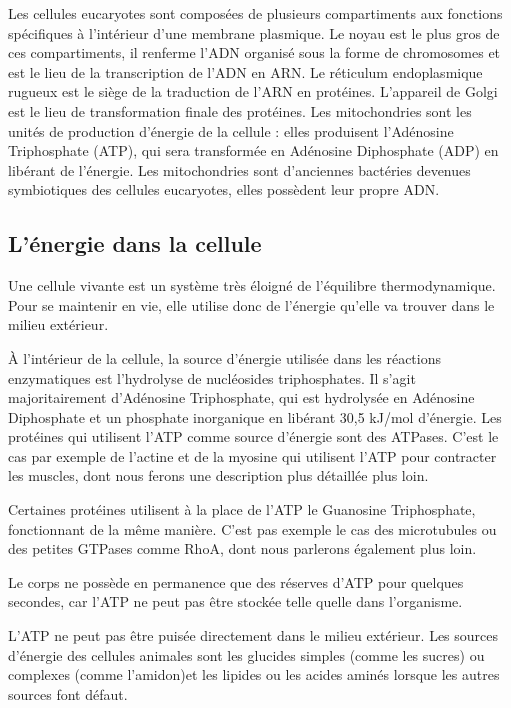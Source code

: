 Les cellules eucaryotes sont composées de plusieurs compartiments aux fonctions spécifiques à l'intérieur d'une membrane plasmique. Le noyau est le plus gros de ces compartiments, il renferme l'ADN organisé sous la forme de chromosomes et est le lieu de la transcription de l'ADN en ARN. 
Le réticulum endoplasmique rugueux est le siège de la traduction de l'ARN en protéines. 
L'appareil de Golgi est le lieu de transformation finale des protéines. 
Les mitochondries sont les unités de production d'énergie de la cellule : elles produisent l'Adénosine Triphosphate (ATP), qui sera transformée en Adénosine Diphosphate (ADP) en libérant de l'énergie. Les mitochondries sont d'anciennes bactéries devenues symbiotiques des cellules eucaryotes, elles possèdent leur propre ADN. 

\subsection{L'énergie dans la cellule}

Une cellule vivante est un système très éloigné de l'équilibre thermodynamique. Pour se maintenir en vie, elle utilise donc de l'énergie qu'elle va trouver dans le milieu extérieur. 

À l'intérieur de la cellule, la source d'énergie utilisée dans les réactions enzymatiques est l'hydrolyse de nucléosides triphosphates. 
Il s'agit majoritairement d'Adénosine Triphosphate, qui est hydrolysée en Adénosine Diphosphate et un phosphate inorganique en libérant 30,5 kJ/mol d'énergie. 
Les protéines qui utilisent l'ATP comme source d'énergie sont des ATPases. 
C'est le cas par exemple de l'actine et de la myosine qui utilisent l'ATP pour contracter les muscles, dont nous ferons une description plus détaillée plus loin. 

Certaines protéines utilisent à la place de l'ATP le Guanosine Triphosphate, fonctionnant de la même manière. 
C'est pas exemple le cas des microtubules ou des petites GTPases comme RhoA, dont nous parlerons également plus loin. 

Le corps ne possède en permanence que des réserves d'ATP pour quelques secondes, car l'ATP ne peut pas être stockée telle quelle dans l'organisme. 

L'ATP ne peut pas être puisée directement dans le milieu extérieur. Les sources d'énergie des cellules animales sont les glucides simples (comme les sucres) ou complexes (comme l'amidon)et les lipides ou les acides aminés lorsque les autres sources font défaut. 

